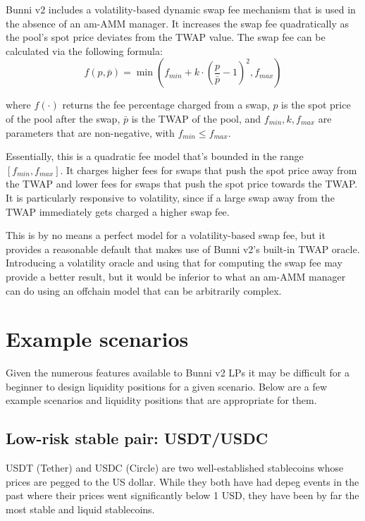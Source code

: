 \documentclass[twocolumn]{article}
\begin{document}
Bunni v2 includes a volatility-based dynamic swap fee mechanism that is used in the absence of an am-AMM manager. It increases the swap fee quadratically as the pool's spot price deviates from the TWAP value. The swap fee can be calculated via the following formula:
\begin{equation}
  f(p, \bar p) = \min (f_{min} + k \cdot (\frac{p}{\bar p} - 1)^2, f_{max})
\end{equation}

where $f(\cdot)$ returns the fee percentage charged from a swap, $p$ is the spot price of the pool after the swap, $\bar p$ is the TWAP of the pool, and $f_{min}, k, f_{max}$ are parameters that are non-negative, with $f_{min} \le f_{max}$.

Essentially, this is a quadratic fee model that's bounded in the range $[f_{min}, f_{max}]$. It charges higher fees for swaps that push the spot price away from the TWAP and lower fees for swaps that push the spot price towards the TWAP. It is particularly responsive to volatility, since if a large swap away from the TWAP immediately gets charged a higher swap fee.

This is by no means a perfect model for a volatility-based swap fee, but it provides a reasonable default that makes use of Bunni v2's built-in TWAP oracle. Introducing a volatility oracle and using that for computing the swap fee may provide a better result, but it would be inferior to what an am-AMM manager can do using an offchain model that can be arbitrarily complex.

\section{Example scenarios}

Given the numerous features available to Bunni v2 LPs it may be difficult for a beginner to design liquidity positions for a given scenario.  Below are a few example scenarios and liquidity positions that are appropriate for them.

\subsection{Low-risk stable pair: USDT/USDC}

USDT (Tether)\cite{Tether} and USDC (Circle)\cite{Circle} are two well-established stablecoins whose prices are pegged to the US dollar. While they both have had depeg events in the past where their prices went significantly below 1 USD, they have been by far the most stable and liquid stablecoins.
\end{document}
